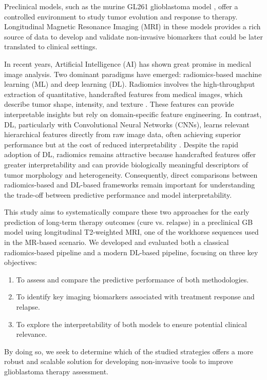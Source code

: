 \documentclass{article}
\begin{document}
Preclinical models, such as the murine GL261 glioblastoma model \cite{Liu2021,Wu2020}, offer a controlled environment to study tumor evolution and response to therapy. Longitudinal Magnetic Resonance Imaging (MRI) in these models provides a rich source of data to develop and validate non-invasive biomarkers that could be later translated to clinical settings.

In recent years, Artificial Intelligence (AI) has shown great promise in medical image analysis. Two dominant paradigms have emerged: radiomics-based machine learning (ML) and deep learning (DL). Radiomics involves the high-throughput extraction of quantitative, handcrafted features from medical images, which describe tumor shape, intensity, and texture \cite{kumar2012radiomics}. These features can provide interpretable insights but rely on domain-specific feature engineering. In contrast, DL, particularly with Convolutional Neural Networks (CNNs), learns relevant hierarchical features directly from raw image data, often achieving superior performance but at the cost of reduced interpretability \cite{Hosny2018,Tran2021,Shen2017}. Despite the rapid adoption of DL, radiomics remains attractive because handcrafted features offer greater interpretability and can provide biologically meaningful descriptors of tumor morphology and heterogeneity. Consequently, direct comparisons between radiomics-based and DL-based frameworks remain important for understanding the trade-off between predictive performance and model interpretability.

This study aims to systematically compare these two approaches for the early prediction of long-term therapy outcomes (cure vs. relapse) in a preclinical GB model using longitudinal T2-weighted MRI, one of the workhorse sequences used in the MR-based scenario. We developed and evaluated both a classical radiomics-based pipeline and a modern DL-based pipeline, focusing on three key objectives:
\begin{enumerate}
    \item To assess and compare the predictive performance of both methodologies.
    \item To identify key imaging biomarkers associated with treatment response and relapse.
    \item To explore the interpretability of both models to ensure potential clinical relevance.
\end{enumerate}

By doing so, we seek to determine which of the studied strategies offers a more robust and scalable solution for developing non-invasive tools to improve glioblastoma therapy assessment.
\end{document}
